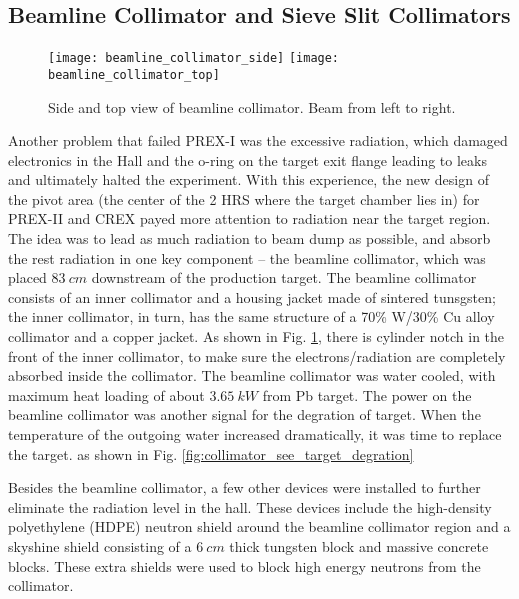\subsection{Beamline Collimator and Sieve Slit Collimators}
\begin{figure}[h!]
    \centering
    \texttt{[image: beamline\_collimator\_side]}
    \hspace{1 cm}
    \texttt{[image: beamline\_collimator\_top]}
    \caption{Side and top view of beamline collimator. Beam from left to right.}
    \label{fig:beamline_collimator}
\end{figure}

Another problem that failed PREX-I was the excessive radiation, which damaged 
electronics in the Hall and the o-ring on the target exit flange leading to
leaks and ultimately halted the experiment.
With this experience, the new design of the pivot area (the center of the 2 HRS 
where the target chamber lies in) for PREX-II and CREX payed more attention
to radiation near the target region. The idea was to lead as much radiation to
beam dump as possible, and absorb the rest radiation in one key component --
the beamline collimator, which was placed $83\ cm$ downstream of the production 
target. The beamline collimator consists of an inner collimator and a housing
jacket made of sintered tunsgsten; the inner collimator, in turn, has the same 
structure of a 70\% W/30\% Cu alloy collimator and a copper jacket. As shown
in Fig. \ref{fig:beamline_collimator}, there is cylinder notch in the front of
the inner collimator, to make sure the electrons/radiation are completely 
absorbed inside the collimator. The beamline collimator was water cooled, with
maximum heat loading of about $3.65\ kW$ from Pb target. The power on the beamline
collimator was another signal for the degration of target. When the temperature 
of the outgoing water increased dramatically, it was time to replace the target.
as shown in Fig. \ref{fig:collimator_see_target_degration}

Besides the beamline collimator, a few other devices were installed 
to further eliminate the radiation level in the hall. These devices include the 
high-density polyethylene (HDPE) neutron shield around the beamline collimator
region and a skyshine shield consisting of a $6\ cm$ thick tungsten block and
massive concrete blocks. These extra shields were used to block high energy
neutrons from the collimator.

